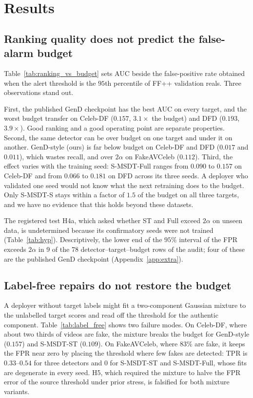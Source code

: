 \section{Results}
\label{sec:results}

\subsection{Ranking quality does not predict the false-alarm budget}
\label{sec:res_zero}



Table~\ref{tab:ranking_vs_budget} sets AUC beside the false-positive rate obtained when the alert threshold is the $95$th percentile of FF++ validation reals. Three observations stand out.

First, the published GenD checkpoint has the best AUC on every target, and the worst budget transfer on Celeb-DF ($0.157$, $3.1\times$ the budget) and DFD ($0.193$, $3.9\times$). Good ranking and a good operating point are separate properties. Second, the same detector can be over budget on one target and under it on another. GenD-style (ours) is far below budget on Celeb-DF and DFD ($0.017$ and $0.011$), which wastes recall, and over $2\alpha$ on FakeAVCeleb ($0.112$). Third, the effect varies with the training seed: S-MSDT-Full ranges from $0.090$ to $0.157$ on Celeb-DF and from $0.066$ to $0.181$ on DFD across its three seeds. A deployer who validated one seed would not know what the next retraining does to the budget. Only S-MSDT-S stays within a factor of $1.5$ of the budget on all three targets, and we have no evidence that this holds beyond these datasets.

The registered test H4a, which asked whether ST and Full exceed $2\alpha$ on unseen data, is undetermined because its confirmatory seeds were not trained (Table~\ref{tab:hyp}). Descriptively, the lower end of the $95\%$ interval of the FPR exceeds $2\alpha$ in 9 of the 78 detector--target--budget rows of the audit; four of these are the published GenD checkpoint (Appendix~\ref{app:extra}).

\subsection{Label-free repairs do not restore the budget}
\label{sec:res_labelfree}



A deployer without target labels might fit a two-component Gaussian mixture to the unlabelled target scores and read off the threshold for the authentic component. Table~\ref{tab:label_free} shows two failure modes. On Celeb-DF, where about two thirds of videos are fake, the mixture breaks the budget for GenD-style ($0.157$) and S-MSDT-ST ($0.109$). On FakeAVCeleb, where $83\%$ are fake, it keeps the FPR near zero by placing the threshold where few fakes are detected: TPR is $0.33$--$0.54$ for three detectors and $0$ for S-MSDT-ST and S-MSDT-Full, whose fits are degenerate in every seed. H5, which required the mixture to halve the FPR error of the source threshold under prior stress, is falsified for both mixture variants.

